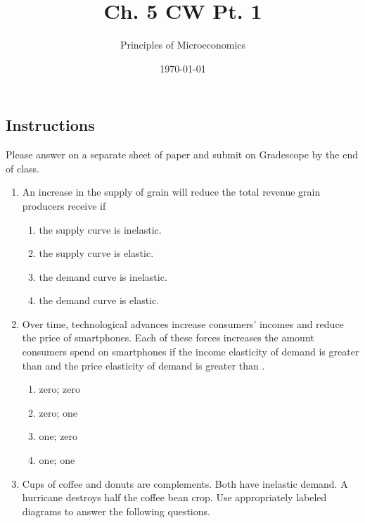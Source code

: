 \documentclass{article}
\title{Ch. 5 CW Pt. 1}
\author{Principles of Microeconomics}
\date{\today}
\begin{document}
\maketitle

\subsection*{Instructions} Please answer on a separate sheet of paper and submit on Gradescope by the end of class.

\begin{enumerate}

\item An increase in the supply of grain will reduce the total revenue grain producers receive if

	\begin{enumerate}
	
	\item the supply curve is inelastic.
	
	\item the supply curve is elastic.
	
	\item the demand curve is inelastic.
	
	\item the demand curve is elastic.
	
	\end{enumerate}
	
\item Over time, technological advances increase consumers' incomes and reduce the price of smartphones. Each of these forces increases the amount consumers spend on smartphones if the income elasticity of demand is greater than \underline{\phantom{xxxxxxxxxx}} and the price elasticity of demand is greater than \underline{\phantom{xxxxxxxxxx}}.

	\begin{enumerate}
	
	\item zero; zero
	
	\item zero; one
	
	\item one; zero
	
	\item one; one
	
	\end{enumerate}

\item Cups of coffee and donuts are complements. Both have inelastic demand. A hurricane destroys half the coffee bean crop. Use appropriately labeled diagrams to answer the following questions.


\end{enumerate}
\end{document}
